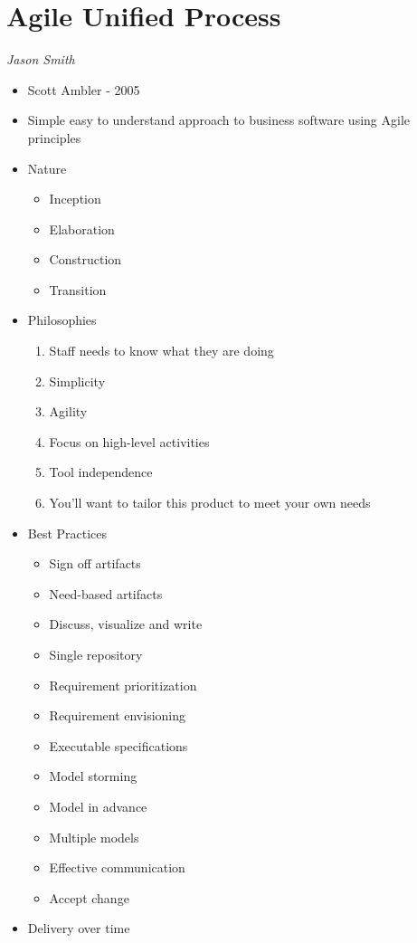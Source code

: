 \documentclass{report}
\begin{document}
		\section{Agile Unified Process}
			\textit{Jason Smith}
			\begin{itemize}
				\item Scott Ambler - 2005
				\item Simple easy to understand approach to business software using Agile principles
				\item Nature
					\begin{itemize}
						\item Inception
						\item Elaboration
						\item Construction
						\item Transition
					\end{itemize}
				\item Philosophies
					\begin{enumerate}
						\item Staff needs to know what they are doing
						\item Simplicity
						\item Agility
						\item Focus on high-level activities
						\item Tool independence
						\item You'll want to tailor this product to meet your own needs
					\end{enumerate}
				\item Best Practices
					\begin{itemize}
						\item Sign off artifacts
						\item Need-based artifacts
						\item Discuss, visualize and write
						\item Single repository
						\item Requirement prioritization
						\item Requirement envisioning
						\item Executable specifications
						\item Model storming
						\item Model in advance
						\item Multiple models
						\item Effective communication
						\item Accept change
					\end{itemize}
				\item Delivery over time
			\end{itemize}
\end{document}
